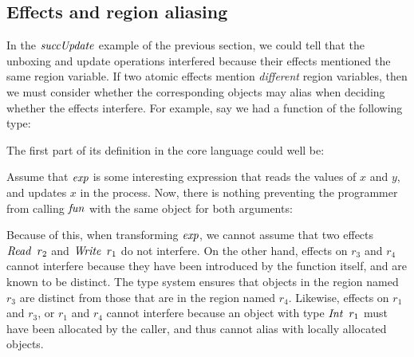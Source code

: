 \subsection{Effects and region aliasing}
\label{Core:Optimisation:effects-and-region-aliasing}

In the $\operatorname{\mathit{succUpdate}}$ example of the previous section, we could tell that the unboxing and update operations interfered because their effects mentioned the same region variable. If two atomic effects mention \emph{different} region variables, then we must consider whether the corresponding objects may alias when deciding whether the effects interfere. For example, say we had a function of the following type:


The first part of its definition in the core language could well be:


Assume that $\operatorname{\mathit{exp}}$ is some interesting expression that reads the values of $x$ and $y$, and updates $x$ in the process. Now, there is nothing preventing the programmer from calling $\operatorname{\mathit{fun}}$ with the same object for both arguments:

		
Because of this, when transforming $\operatorname{\mathit{exp}}$, we cannot assume that two effects $\operatorname{\mathit{Read}} \ r_2$ and $\operatorname{\mathit{Write}} \ r_1$ do not interfere. On the other hand, effects on $r_3$ and $r_4$ cannot interfere because they have been introduced by the function itself, and are known to be distinct. The type system ensures that objects in the region named $r_3$ are distinct from those that are in the region named $r_4$. Likewise, effects on $r_1$ and $r_3$, or $r_1$ and $r_4$ cannot interfere because an object with type $\operatorname{\mathit{Int}} \ r_1$ must have been allocated by the caller, and thus cannot alias with locally allocated objects.

